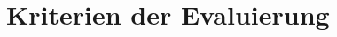 \documentclass[a4paper, 12pt, listof=totoc, bibliography=totoc]{scrreprt}
\begin{document}
\section{Kriterien der Evaluierung}

%
%
%
%
%
\end{document}
